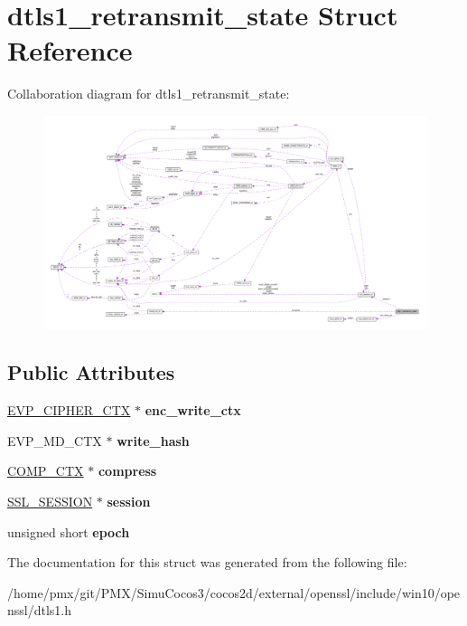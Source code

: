 \hypertarget{structdtls1__retransmit__state}{}\section{dtls1\+\_\+retransmit\+\_\+state Struct Reference}
\label{structdtls1__retransmit__state}


Collaboration diagram for dtls1\+\_\+retransmit\+\_\+state\+:
\nopagebreak
\begin{figure}[H]
\begin{center}
\leavevmode
\includegraphics[width=350pt]{structdtls1__retransmit__state__coll__graph}
\end{center}
\end{figure}
\subsection*{Public Attributes}
\begin{DoxyCompactItemize}
\item 
\mbox{\label{structdtls1__retransmit__state_ae1e9d630767c9f03cbbdf719fb84d05f}} 
\hyperlink{structevp__cipher__ctx__st}{E\+V\+P\+\_\+\+C\+I\+P\+H\+E\+R\+\_\+\+C\+TX} $\ast$ {\bfseries enc\+\_\+write\+\_\+ctx}
\item 
\mbox{\label{structdtls1__retransmit__state_aabb799421e4698d91594730ac7758f7a}} 
E\+V\+P\+\_\+\+M\+D\+\_\+\+C\+TX $\ast$ {\bfseries write\+\_\+hash}
\item 
\mbox{\label{structdtls1__retransmit__state_a25bba837f21b15d59f3ce572f8255a24}} 
\hyperlink{structcomp__ctx__st}{C\+O\+M\+P\+\_\+\+C\+TX} $\ast$ {\bfseries compress}
\item 
\mbox{\label{structdtls1__retransmit__state_ad953293227cf8db42778e560516d160f}} 
\hyperlink{structssl__session__st}{S\+S\+L\+\_\+\+S\+E\+S\+S\+I\+ON} $\ast$ {\bfseries session}
\item 
\mbox{\label{structdtls1__retransmit__state_a8a8ac3e9aaaeee2fe91f54ad027f17a9}} 
unsigned short {\bfseries epoch}
\end{DoxyCompactItemize}


The documentation for this struct was generated from the following file\+:\begin{DoxyCompactItemize}
\item 
/home/pmx/git/\+P\+M\+X/\+Simu\+Cocos3/cocos2d/external/openssl/include/win10/openssl/dtls1.\+h\end{DoxyCompactItemize}
